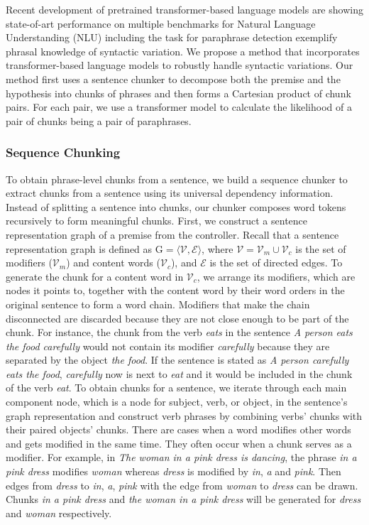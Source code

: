 \documentclass[11pt,a4paper]{article}
\begin{document}
Recent development of pretrained transformer-based language models are showing state-of-art performance on multiple benchmarks for Natural Language Understanding (NLU) including the task for paraphrase detection \cite{devlin-etal-2019-bert, Lan2020ALBERT:, liu2020roberta}
exemplify phrasal knowledge of syntactic variation. We propose a method that incorporates transformer-based language models to robustly handle syntactic variations. Our method first uses a sentence chunker to decompose both the premise and the hypothesis into chunks of phrases and then forms a Cartesian product of chunk pairs. For each pair, we use a transformer model to calculate the likelihood of a pair of chunks being a pair of paraphrases.  

\subsubsection{Sequence Chunking}
 To obtain phrase-level chunks from a sentence, we build a sequence chunker to extract chunks from a sentence using its universal dependency information. Instead of splitting a sentence into chunks, our chunker composes word tokens recursively to form meaningful chunks. First, we construct a sentence representation graph of a premise from the controller. Recall that a sentence representation graph is defined as $\mathrm{G} = \langle \mathcal{V}, \mathcal{E} \rangle$, where $\mathcal{V} = \mathcal{V}_{m} \cup \mathcal{V}_{c}$ is the set of modifiers ($\mathcal{V}_{m}$) and content words ($\mathcal{V}_{c}$), and $\mathcal{E}$ is the set of directed edges. To generate the chunk for a content word in $\mathcal{V}_{c}$, we arrange its modifiers, which are nodes it points to, together with the content word by their word orders in the original sentence to form a word chain. Modifiers that make the chain disconnected are discarded because they are not close enough to be part of the chunk. For instance, the chunk from the verb \textit{eats} in the sentence \textit{A person eats the food carefully} would not contain its modifier \textit{carefully} because they are separated by the object \textit{the food}. If the sentence is stated as \textit{A person carefully eats the food}, \textit{carefully} now is next to \textit{eat} and it would be included in the chunk of the verb \textit{eat}. To obtain chunks for a sentence, we iterate through each main component node, which is a node for subject, verb, or object, in the sentence's graph representation and construct verb phrases by combining verbs' chunks with their paired objects' chunks. There are cases when a word modifies other words and gets modified in the same time. They often occur when a chunk serves as a modifier. For example, in \textit{The woman in a pink dress is dancing}, the phrase \textit{in a pink dress} modifies \textit{woman} whereas \textit{dress} is modified by \textit{in}, \textit{a} and \textit{pink}. Then edges from \textit{dress} to \textit{in}, \textit{a}, \textit{pink} with the edge from \textit{woman} to \textit{dress} can be drawn. Chunks \textit{in a pink dress} and \textit{the woman in a pink dress} will be generated for \textit{dress} and \textit{woman} respectively.
 
\end{document}
